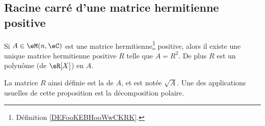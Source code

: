\subsection{Racine carré d'une matrice hermitienne positive}

\begin{proposition}     \label{PropVZvCWn}
    Si \( A\in \eM(n,\eC)\) est une matrice hermitienne\footnote{Définition \ref{DEFooKEBHooWwCKRK}.} positive, alors il existe une unique matrice hermitienne positive \( R\) telle que \( A=R^2\). De plus \( R\) est un polynôme (de \( \eR[X]\)) en \( A\).
\end{proposition}

La matrice \( R\) ainsi définie est la  de \( A\), et est notée \( \sqrt{A}\). Une des applications usuelles de cette proposition est la décomposition polaire.

